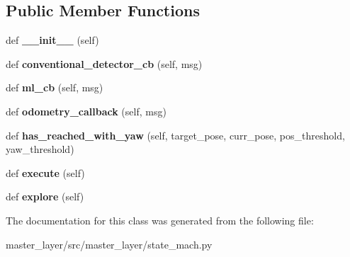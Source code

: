 \subsection*{Public Member Functions}
\begin{DoxyCompactItemize}
\item 
\mbox{\label{classmaster__layer_1_1state__mach_1_1FindFrontTarget_ad1d5a3483204ec88731ac498a7650bb0}} 
def {\bfseries \+\_\+\+\_\+init\+\_\+\+\_\+} (self)
\item 
\mbox{\label{classmaster__layer_1_1state__mach_1_1FindFrontTarget_a4778c27a63368bb9700f2d87dc77a474}} 
def {\bfseries conventional\+\_\+detector\+\_\+cb} (self, msg)
\item 
\mbox{\label{classmaster__layer_1_1state__mach_1_1FindFrontTarget_afe5a90f3d8b4c7fa03add79337438274}} 
def {\bfseries ml\+\_\+cb} (self, msg)
\item 
\mbox{\label{classmaster__layer_1_1state__mach_1_1FindFrontTarget_a4a89a085e91502fd35a72f4bc2722cb1}} 
def {\bfseries odometry\+\_\+callback} (self, msg)
\item 
\mbox{\label{classmaster__layer_1_1state__mach_1_1FindFrontTarget_ae9a3b4cbeb328b614e2c573ab32ef1fd}} 
def {\bfseries has\+\_\+reached\+\_\+with\+\_\+yaw} (self, target\+\_\+pose, curr\+\_\+pose, pos\+\_\+threshold, yaw\+\_\+threshold)
\item 
\mbox{\label{classmaster__layer_1_1state__mach_1_1FindFrontTarget_abc13a9a78656f54508b7d819c6fe53c4}} 
def {\bfseries execute} (self)
\item 
\mbox{\label{classmaster__layer_1_1state__mach_1_1FindFrontTarget_a9f77b7e45c5850fe2f2d4e7388c227b7}} 
def {\bfseries explore} (self)
\end{DoxyCompactItemize}


The documentation for this class was generated from the following file\+:\begin{DoxyCompactItemize}
\item 
master\+\_\+layer/src/master\+\_\+layer/state\+\_\+mach.\+py\end{DoxyCompactItemize}
